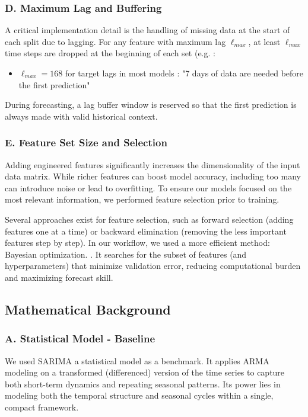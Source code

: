 \subsubsection*{D. Maximum Lag and Buffering}
A critical implementation detail is the handling of missing data at the start of each 
split due to lagging. For any feature with maximum lag $\ell_{max}$, at least 
$\ell_{max}$ time steps are dropped at the beginning of each set (e.g. :
\vspace{-0.4cm}
\begin{itemize}
    \item $\ell_{max}=168$ for target lags in most models : "7 days of data are needed before the first prediction"
\end{itemize}
\vspace{-0.4cm}
During forecasting, a lag buffer window is reserved so that the first prediction is always 
made with valid historical context.

\subsubsection*{E. Feature Set Size and Selection}
Adding engineered features significantly increases the dimensionality of the input 
data matrix. While richer features can boost model accuracy, including too many can 
introduce noise or lead to overfitting. To ensure our models focused on the most 
relevant information, we performed feature selection prior to training.

Several approaches exist for feature selection, such as forward selection (adding 
features one at a time) or backward elimination (removing the less important features step
by step). In our workflow, we used a more efficient method: Bayesian optimization.
\cite{sklearn_feature_selection}. It searches for the subset of features (and 
hyperparameters) that minimize validation error, reducing computational burden and 
maximizing forecast skill.


\subsection{Mathematical Background}
\label{subsec:math}

\subsubsection*{A. Statistical Model - Baseline}

We used SARIMA a statistical model as a benchmark. It applies ARMA modeling on a 
transformed (differenced) version of the time series to capture both short-term 
dynamics and repeating seasonal patterns. Its power lies in modeling both the temporal 
structure and seasonal cycles within a single, compact framework.

